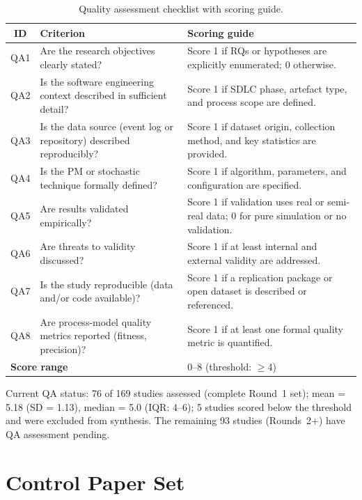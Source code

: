 \begin{table}[htbp]
\centering
\caption{Quality assessment checklist with scoring guide.}
\label{tab:app-qa-full}
\small
\setlength{\tabcolsep}{4pt}
\begin{tabular}{c p{5.5cm} p{5.5cm}}
\toprule
\textbf{ID} & \textbf{Criterion} & \textbf{Scoring guide} \\
\midrule
QA1 & Are the research objectives clearly stated? &
  Score 1 if RQs or hypotheses are explicitly enumerated; 0 otherwise. \\
QA2 & Is the software engineering context described in sufficient detail? &
  Score 1 if SDLC phase, artefact type, and process scope are defined. \\
QA3 & Is the data source (event log or repository) described reproducibly? &
  Score 1 if dataset origin, collection method, and key statistics are provided. \\
QA4 & Is the PM or stochastic technique formally defined? &
  Score 1 if algorithm, parameters, and configuration are specified. \\
QA5 & Are results validated empirically? &
  Score 1 if validation uses real or semi-real data; 0 for pure simulation or no validation. \\
QA6 & Are threats to validity discussed? &
  Score 1 if at least internal and external validity are addressed. \\
QA7 & Is the study reproducible (data and/or code available)? &
  Score 1 if a replication package or open dataset is described or referenced. \\
QA8 & Are process-model quality metrics reported (fitness, precision)? &
  Score 1 if at least one formal quality metric is quantified. \\
\midrule
\multicolumn{2}{l}{\textbf{Score range}} & 0--8 (threshold: $\geq$4) \\
\bottomrule
\end{tabular}
\end{table}

Current QA status: 76 of 169 studies assessed (complete Round~1 set);
mean = 5.18 (SD = 1.13), median = 5.0 (IQR: 4--6); 5 studies scored below
the threshold and were excluded from synthesis. The remaining 93 studies
(Rounds~2+) have QA assessment pending.

\section{Control Paper Set}
\label{app:slr-control}

